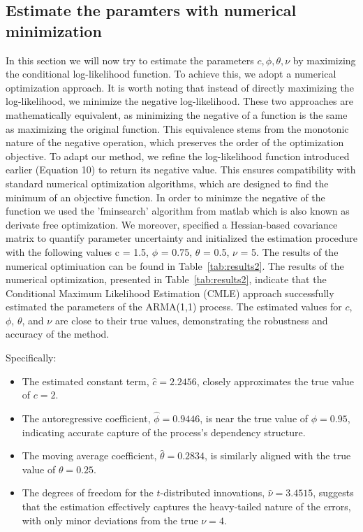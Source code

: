 \documentclass[a4paper,12pt]{article}
\begin{document}
\subsection{Estimate the paramters with numerical minimization}
In this section we will now try to estimate the parameters $c, \phi, \theta,\nu$ by maximizing the conditional log-likelihood function. To achieve this, we adopt a numerical optimization approach.
It is worth noting that instead of directly maximizing the log-likelihood, we minimize the negative log-likelihood. These two approaches are mathematically equivalent, as minimizing the negative of a function is the same as maximizing the original function. This equivalence stems from the monotonic nature of the negative operation, which preserves the order of the optimization objective.
To adapt our method, we refine the log-likelihood function introduced earlier (Equation 10) to return its negative value. This ensures compatibility with standard numerical optimization algorithms, which are designed to find the minimum of an objective function. In order to minimze the negative of the function we used the 'fminsearch' algorithm from matlab which is also known as derivate free optimization. 
We moreover, specified a Hessian-based covariance matrix to quantify parameter uncertainty and initialized the estimation procedure with the following values c = 1.5, $\phi$ = 0.75, $\theta$ = 0.5, $\nu$ = 5.
The results of the numerical optimiuation can be found in Table~\ref{tab:results2}.
The results of the numerical optimization, presented in Table~\ref{tab:results2}, indicate that the Conditional Maximum Likelihood Estimation (CMLE) approach successfully estimated the parameters of the ARMA(1,1) process. The estimated values for \(c\), \(\phi\), \(\theta\), and \(\nu\) are close to their true values, demonstrating the robustness and accuracy of the method.

Specifically:
\begin{itemize}
    \item The estimated constant term, \(\hat{c} = 2.2456\), closely approximates the true value of \(c = 2\).
    \item The autoregressive coefficient, \(\hat{\phi} = 0.9446\), is near the true value of \(\phi = 0.95\), indicating accurate capture of the process's dependency structure.
    \item The moving average coefficient, \(\hat{\theta} = 0.2834\), is similarly aligned with the true value of \(\theta = 0.25\).
    \item The degrees of freedom for the \(t\)-distributed innovations, \(\hat{\nu} = 3.4515\), suggests that the estimation effectively captures the heavy-tailed nature of the errors, with only minor deviations from the true \(\nu = 4\).
\end{itemize}
\end{document}
